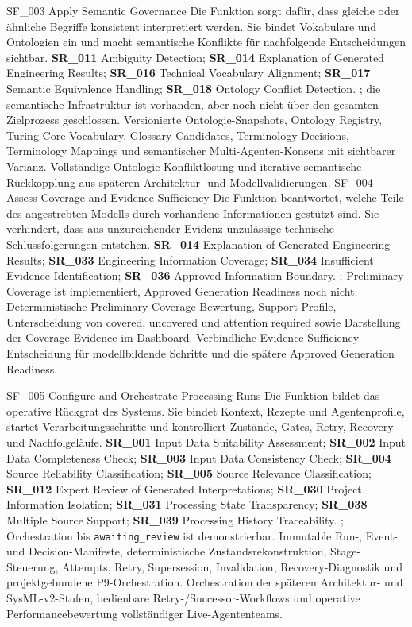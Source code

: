 \featureprofile
{SF\_003}
{Apply Semantic Governance}
{Die Funktion sorgt dafür, dass gleiche oder ähnliche Begriffe konsistent
interpretiert werden. Sie bindet Vokabulare und Ontologien ein und macht
semantische Konflikte für nachfolgende Entscheidungen sichtbar.}
{\textbf{SR\_011} Ambiguity Detection;
\textbf{SR\_014} Explanation of Generated Engineering Results;
\textbf{SR\_016} Technical Vocabulary Alignment;
\textbf{SR\_017} Semantic Equivalence Handling;
\textbf{SR\_018} Ontology Conflict Detection.}
{; die semantische Infrastruktur ist
vorhanden, aber noch nicht über den gesamten Zielprozess geschlossen.}
{Versionierte Ontologie-Snapshots, Ontology Registry, Turing Core Vocabulary,
Glossary Candidates, Terminology Decisions, Terminology Mappings und
semantischer Multi-Agenten-Konsens mit sichtbarer Varianz.}
{Vollständige Ontologie-Konfliktlösung und iterative semantische Rückkopplung
aus späteren Architektur- und Modellvalidierungen.}
\pagebreak
\featureprofile
{SF\_004}
{Assess Coverage and Evidence Sufficiency}
{Die Funktion beantwortet, welche Teile des angestrebten Modells durch
vorhandene Informationen gestützt sind. Sie verhindert, dass aus unzureichender
Evidenz unzulässige technische Schlussfolgerungen entstehen.}
{\textbf{SR\_014} Explanation of Generated Engineering Results;
\textbf{SR\_033} Engineering Information Coverage;
\textbf{SR\_034} Insufficient Evidence Identification;
\textbf{SR\_036} Approved Information Boundary.}
{; Preliminary Coverage ist
implementiert, Approved Generation Readiness noch nicht.}
{Deterministische Preliminary-Coverage-Bewertung, Support Profile,
Unterscheidung von covered, uncovered und attention required sowie
Darstellung der Coverage-Evidence im Dashboard.}
{Verbindliche Evidence-Sufficiency-Entscheidung für modellbildende Schritte
und die spätere Approved Generation Readiness.}

\featureprofile
{SF\_005}
{Configure and Orchestrate Processing Runs}
{Die Funktion bildet das operative Rückgrat des Systems. Sie bindet Kontext,
Rezepte und Agentenprofile, startet Verarbeitungsschritte und kontrolliert
Zustände, Gates, Retry, Recovery und Nachfolgeläufe.}
{\textbf{SR\_001} Input Data Suitability Assessment;
\textbf{SR\_002} Input Data Completeness Check;
\textbf{SR\_003} Input Data Consistency Check;
\textbf{SR\_004} Source Reliability Classification;
\textbf{SR\_005} Source Relevance Classification;
\textbf{SR\_012} Expert Review of Generated Interpretations;
\textbf{SR\_030} Project Information Isolation;
\textbf{SR\_031} Processing State Transparency;
\textbf{SR\_038} Multiple Source Support;
\textbf{SR\_039} Processing History Traceability.}
{; Orchestration bis
\texttt{awaiting\_review} ist demonstrierbar.}
{Immutable Run-, Event- und Decision-Manifeste, deterministische
Zustandsrekonstruktion, Stage-Steuerung, Attempts, Retry, Supersession,
Invalidation, Recovery-Diagnostik und projektgebundene P9-Orchestration.}
{Orchestration der späteren Architektur- und SysML-v2-Stufen,
bedienbare Retry-/Successor-Workflows und operative Performancebewertung
vollständiger Live-Agententeams.}

